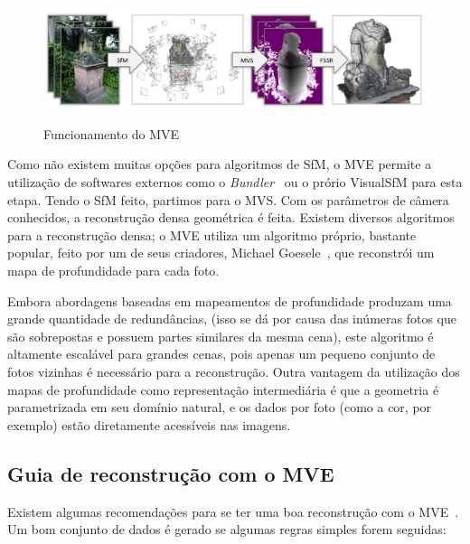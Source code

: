 \newpage

\begin{figure}[!h]
	\centering
	\caption{Funcionamento do MVE}
	\includegraphics[width=\linewidth]{figs/mvepipe.png}
   \label{fig:mvepipeline}
\end{figure}

Como não existem muitas opções para algoritmos de SfM, o MVE permite a
utilização de softwares externos como o
\emph{Bundler}~\cite{snavely2010bundler} ou o prório VisualSfM para esta
etapa.  Tendo o SfM feito, partimos para o MVS. Com os parâmetros
de câmera conhecidos, a reconstrução densa geométrica é feita. Existem diversos
algoritmos para a reconstrução densa; o MVE utiliza um algoritmo
próprio, bastante popular, feito por um de seus criadores, Michael
Goesele~\cite{goesele2007multi}, que reconstrói um mapa de profundidade para
cada foto. 

Embora abordagens baseadas em mapeamentos de profundidade produzam uma grande
quantidade de redundâncias, (isso se dá por causa das inúmeras fotos que são
sobrepostas e possuem partes similares da mesma cena), este algoritmo é
altamente escalável para grandes cenas, pois apenas um pequeno conjunto de fotos
vizinhas é necessário para a reconstrução. Outra vantagem da utilização dos
mapas de profundidade como representação intermediária é que a geometria é
parametrizada em seu domínio natural, e os dados por foto (como a cor, por
exemplo) estão diretamente acessíveis nas imagens.

\subsection{Guia de reconstrução com o MVE}
Existem algumas recomendações para se ter uma boa reconstrução com o MVE~\cite{mve}.
Um bom conjunto de dados é gerado se algumas regras simples forem seguidas:

